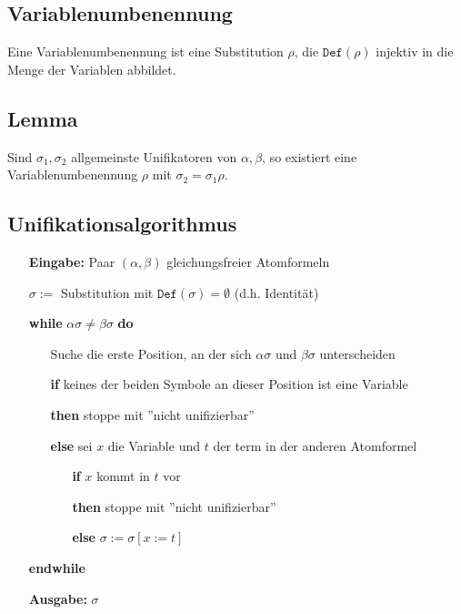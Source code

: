 \documentclass[12pt,a4paper]{report}
\newcommand{\red}[1]{\textcolor[rgb]{0.9,0.2,0.2}{#1}}
\newcommand{\green}[1]{\textcolor[rgb]{0.1,0.6,0.1}{#1}}
\newcommand{\blue}[1]{\textcolor[rgb]{0.2,0.2,1}{#1}}
\begin{document}
\subsection{\blue{Variablenumbenennung}}
Eine \red{Variablenumbenennung} ist eine Substitution $ \rho $, die $ \texttt{Def}(\rho) $ injektiv in die Menge der Variablen abbildet.
\subsection{\green{Lemma}}
Sind $ \sigma_1, \sigma_2 $ allgemeinste Unifikatoren von $ \alpha, \beta $, so existiert eine Variablenumbenennung $ \rho $ mit $\sigma_2 = \sigma_1 \rho$.

\subsection{\red{Unifikationsalgorithmus}}
\begin{itemize}
    \item[\textbf{Eingabe: }] Paar $ (\alpha,\beta) $ gleichungsfreier Atomformeln
    \item[] $ \sigma := $ Substitution mit $ \texttt{Def}(\sigma) = \emptyset$ (d.h. Identität)
    \item[\textbf{while }] $ \alpha \sigma \neq \beta \sigma $ \textbf{do}
    \item[] \begin{itemize}
        \item[] Suche die erste Position, an der sich $ \alpha\sigma $ und $ \beta\sigma $ unterscheiden
        \item[\textbf{if }] keines der beiden Symbole an dieser Position ist eine Variable
        \item[\textbf{then }] stoppe mit ''nicht unifizierbar''
        \item[\textbf{else }] sei $ x $ die Variable und $ t $ der term in der anderen Atomformel
        \item[] \begin{itemize}
            \item[\textbf{if }] $ x $ kommt in $ t $ vor
            \item[\textbf{then }] stoppe mit ''nicht unifizierbar''
            \item[\textbf{else }] $ \sigma := \sigma[x:=t] $
        \end{itemize}
    \end{itemize}
    \item[\textbf{endwhile}]
    \item[\textbf{Ausgabe: }]$ \sigma $
\end{itemize}
\end{document}

